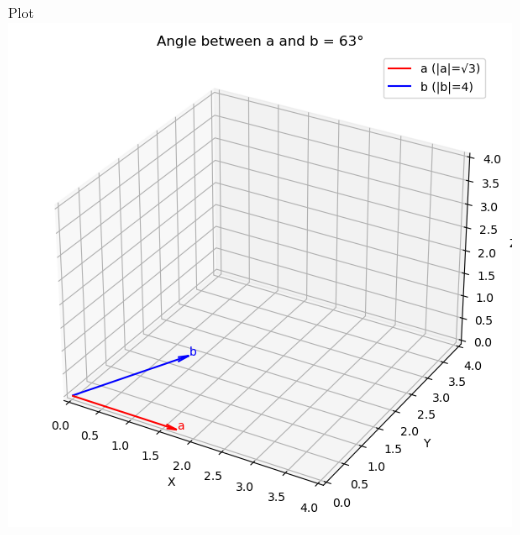 \documentclass{beamer}
\begin{document}
\begin{frame}{Plot}
    \centering
    \includegraphics[width=\columnwidth, height=0.8\textheight, keepaspectratio]{figs/fig3.png}     
\end{frame}
\end{document}
